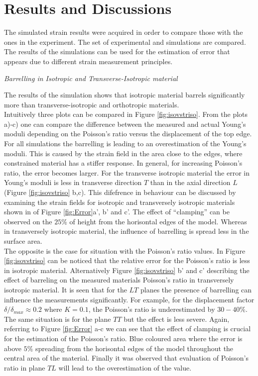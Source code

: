 \documentclass[review]{elsarticle}
\begin{document}
\section{Results and Discussions}
The simulated strain results were acquired in order to compare those with the
ones in the experiment. The set of experimental and simulations are
compared. The results of the simulations can be used for the
estimation of error that appears due to different strain measurement principles.

\begin{description}
\item{\textit{ Barrelling in Isotropic and Transverse-Isotropic material}}
\end{description}
The results of the simulation shows that isotropic material barrels
significantly more than transverse-isotropic and orthotropic materials. \\	
Intuitively three plots can be compared in Figure \ref{fig:isovstriso}. 
From the plots a)-c) one can compare the difference between the measured and actual 
Young's moduli depending on the Poisson's ratio versus the displacement of the
top edge.
For all simulations the barrelling is leading to an overestimation of the
Young's moduli. This is caused by the strain field in the
 area close to the edges, where constrained material has a stiffer response.
In general, for increasing Poisson's ratio, the error becomes larger. 
For the transverse isotropic material the error in Young's moduli is less in
transverse direction $T$ than in the axial direction $L$ (Figure
\ref{fig:isovstriso} b,c).
This difefrence in behaviour can be discussed by examining the strain fields for isotropic and 
transversely isotropic materials shown in of Figure
\ref{fig:Error}a', b' and c'.  The effect of ``clamping'' can be
observed on the $25\%$ of height from the horisontal edges of the model. 
Whereas in transversely isotropic material, the influence of barrelling is
spread less in the surface area.\\
The opposite is the case for situation with the Poisson's ratio values. In
Figure \ref{fig:isovstriso} can be noticed that the relative error for the
Poisson's ratio is less in isotropic material. 
Alternatively Figure \ref{fig:isovstriso} b' and c' describing the effect of barreling on the
measured materials Poisson's ratio in transversely isotropic material. It is
seen that for the $LT$ planes the presence of barrelling can
influence the measurements significantly. For example, for the displacement
factor $\delta/\delta_{max}\approx0.2 $ where $K=0.1$,  the Poisson's ratio is
underestimated by $30-40\%$.
The same situation is for the plane $TT$ but the effect is less severe. Again,
referring to Figure \ref{fig:Error} a-c  we can see that the
effect of clamping is crucial for the estimation of the Poisson's ratio. Blue
coloured area where the error is above $5\%$ spreading from the horisontal edges of 
the model throughout the central area of the material. Finally it was
observed that evaluation of Poisson's ratio in plane $TL$ will lead to
the overestimation of the value.
\end{document}
